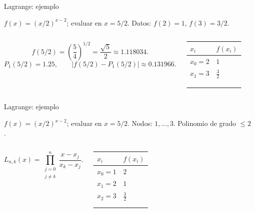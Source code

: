 \documentclass[original_version/main.tex]{subfiles}
\begin{document}
\begin{frame}[t]{Lagrange: ejemplo}
\par\noindent\begin{minipage}[t][7.5mm][t]{\textwidth}\small\strut $f(x)=(x/2)^{x-2}$; evaluar en $x=5/2$. Datos: $f(2)=1$, $f(3)=3/2$.\end{minipage}\par\nointerlineskip
\begin{columns}[T]\small\setlength{\abovedisplayskip}{4pt}\setlength{\belowdisplayskip}{4pt}\[f(5/2)=\left(\frac54\right)^{1/2}=\frac{\sqrt5}{2}\approx1.118034.\]\[P_1(5/2)=1.25,\qquad |f(5/2)-P_1(5/2)|\approx0.131966.\]\begingroup\small\setlength{\tabcolsep}{3pt}\begin{center}\begin{tabular}{|C{.42\textwidth}|C{.42\textwidth}|}\hline
\rule[-2mm]{0pt}{6mm}$x_i$&$f(x_i)$\\\hline
\rule[-2.5mm]{0pt}{6mm}$x_0=2$&$1$\\\hline
\rule[-2.5mm]{0pt}{6mm}$x_1=3$&$\frac{3}{2}$\\\hline
\rule[-2.5mm]{0pt}{6mm}&\\\hline
\rule[-2.5mm]{0pt}{6mm}&\\\hline
\rule[-2.5mm]{0pt}{6mm}&\\\hline
\end{tabular}\end{center}\endgroup\par
\end{columns}
\end{frame}
\begin{frame}[t]{Lagrange: ejemplo}
\par\noindent\begin{minipage}[t][7.5mm][t]{\textwidth}\small\strut $f(x)=(x/2)^{x-2}$; evaluar en $x=5/2$. Nodos: $1,\ldots,3$. Polinomio de grado $\le 2$.\end{minipage}\par\nointerlineskip
\begin{columns}[T]\small\setlength{\abovedisplayskip}{4pt}\setlength{\belowdisplayskip}{4pt}\[L_{n,k}(x)=\prod_{\substack{j=0\\j\ne k}}^n\frac{x-x_j}{x_k-x_j}.\]\begingroup\small\setlength{\tabcolsep}{3pt}\begin{center}\begin{tabular}{|C{.42\textwidth}|C{.42\textwidth}|}\hline
\rule[-2mm]{0pt}{6mm}$x_i$&$f(x_i)$\\\hline
\rule[-2.5mm]{0pt}{6mm}$x_0=1$&$2$\\\hline
\rule[-2.5mm]{0pt}{6mm}$x_1=2$&$1$\\\hline
\rule[-2.5mm]{0pt}{6mm}$x_2=3$&$\frac{3}{2}$\\\hline
\rule[-2.5mm]{0pt}{6mm}&\\\hline
\rule[-2.5mm]{0pt}{6mm}&\\\hline
\end{tabular}\end{center}\endgroup\par
\end{columns}
\end{frame}
\end{document}
